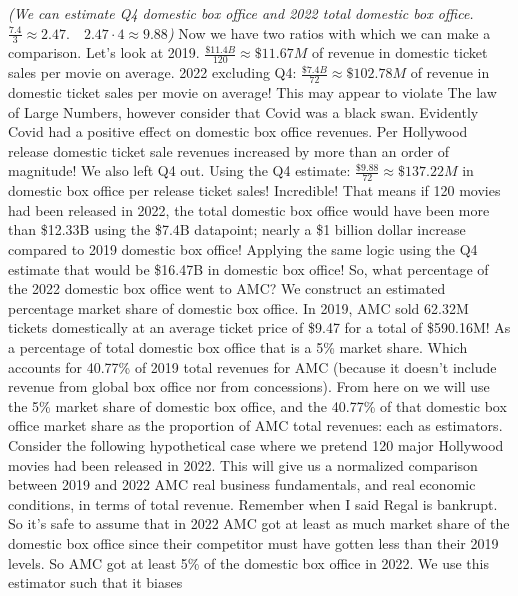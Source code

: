 \documentclass{article}
\begin{document}
\textit{(We can estimate Q4 domestic box office and 2022 total domestic box office. 
$\frac{7.4}{3} \approx 2.47. \quad 2.47 \cdot 4 \approx 9.88$)}
\newpage
\thispagestyle{empty}
Now we have two ratios with which we can make a comparison.
Let's look at 2019. $\frac{\$11.4B}{120} \approx \$11.67M$ of revenue in domestic 
ticket sales per movie on average. 2022 excluding Q4:
$\frac{\$7.4B}{72} \approx \$102.78M$ of revenue in domestic ticket sales per 
movie on average! This may appear to violate The law of Large Numbers, however 
consider that Covid was a black swan. Evidently Covid had a positive effect on 
domestic box office revenues. Per Hollywood release domestic 
ticket sale revenues increased by more than an order of magnitude! We also left 
Q4 out. Using the Q4 estimate: $\frac{\$9.88}{72} \approx \$137.22M$ in domestic 
box office per release ticket sales! Incredible! That means if 120 movies had 
been released in 2022, the total domestic box office would have been more than 
\$12.33B using the \$7.4B datapoint; nearly a \$1 billion dollar increase 
compared to 2019 domestic box office! Applying the same logic using the Q4 
estimate that would be \$16.47B in domestic box office!
\newline \newline
So, what percentage of the 2022 domestic box office went to AMC? We construct an 
estimated percentage market share of domestic box office. In 2019, AMC sold 62.32M 
tickets domestically at an average ticket price of \$9.47 for a total of \$590.16M! 
As a percentage of total domestic box office that is a 5\% market share. Which  
accounts for 40.77\% of 2019 total revenues for AMC (because it doesn't include 
revenue from global box office nor from concessions). From here on we will use the 
5\% market share of domestic box office, and the 40.77\% of that domestic box 
office market share as the proportion of AMC total revenues: each as estimators.
\newline \newline
Consider the following hypothetical case where we pretend 120 major Hollywood movies 
had been released in 2022. This will give us a normalized comparison between 2019 
and 2022 AMC real business fundamentals, and real economic conditions, in terms of 
total revenue. Remember when I said Regal is bankrupt. So it's safe to assume that 
in 2022 AMC got at least as much market share of the domestic box office since 
their competitor must have gotten less than their 2019 levels. So AMC got at least 
5\% of the domestic box office in 2022. We use this estimator such that it biases 
\end{document}
